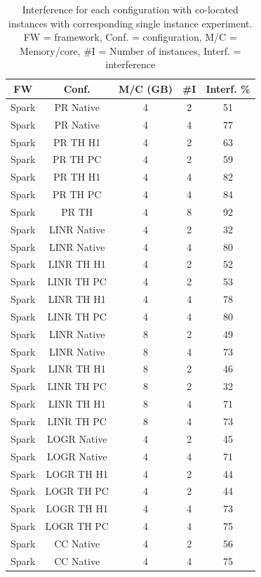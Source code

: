 \begin{table}[thbp]
  \centering
  \caption{Interference for each configuration with co-located instances with corresponding single instance experiment.
	FW = framework, Conf. = configuration, M/C = Memory/core, #I = Number of instances, Interf. = interference }
  \label{tab:interference}
  \begin{tabular}{|c|c|c|c|c|}
    \hline
	  \textbf{FW} & \textbf{Conf.} & \textbf{M/C (GB)} & \textbf{\#I} & \textbf{Interf. \%} \\
    \hline
	  Spark & PR Native & 4 & 2 & 51 \\
	  Spark & PR Native & 4 & 4 & 77 \\
	  Spark & PR TH H1 & 4 & 2 &  63 \\
	  Spark & PR TH PC & 4 & 2 & 59 \\
	  Spark & PR TH H1 & 4 & 4 &  82 \\
	  Spark & PR TH PC & 4 & 4 & 84 \\
	  Spark & PR TH & 4 & 8 & 92 \\
	  Spark & LINR Native & 4 & 2 & 32  \\
	  Spark & LINR Native & 4 & 4 & 80 \\
	  Spark & LINR TH H1 & 4 & 2 & 52 \\
	  Spark & LINR TH PC & 4 & 2 & 53 \\
	  Spark & LINR TH H1 & 4 & 4 & 78 \\
	  Spark & LINR TH PC & 4 & 4 & 80 \\
	  Spark & LINR Native & 8 & 2 & 49 \\
	  Spark & LINR Native & 8 & 4 & 73 \\
	  Spark & LINR TH H1 & 8 & 2 & 46 \\
	  Spark & LINR TH PC & 8 & 2 & 32 \\
	  Spark & LINR TH H1 & 8 & 4 & 71 \\
	  Spark & LINR TH PC & 8 & 4 & 73 \\
	  Spark & LOGR Native & 4 & 2 & 45 \\
	  Spark & LOGR Native & 4 & 4 & 71 \\
	  Spark & LOGR TH H1 & 4 & 2 & 44 \\
	  Spark & LOGR TH PC & 4 & 2 & 44 \\
	  Spark & LOGR TH H1 & 4 & 4 & 73 \\
	  Spark & LOGR TH PC & 4 & 4 & 75 \\
          Spark & CC Native & 4 & 2 & 56 \\
          Spark & CC Native & 4 & 4 & 75 \\

\end{tabular}
\end{table}
